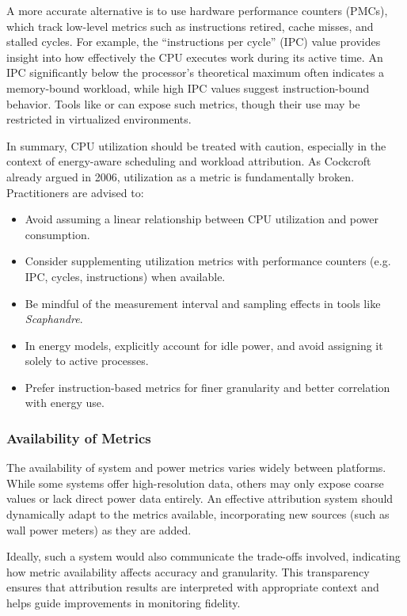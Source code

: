 A more accurate alternative is to use hardware performance counters (PMCs), which track low-level metrics such as instructions retired, cache misses, and stalled cycles. For example, the ``instructions per cycle'' (IPC) value provides insight into how effectively the CPU executes work during its active time. An IPC significantly below the processor's theoretical maximum often indicates a memory-bound workload, while high IPC values suggest instruction-bound behavior. Tools like  or  can expose such metrics, though their use may be restricted in virtualized environments.

In summary, CPU utilization should be treated with caution, especially in the context of energy-aware scheduling and workload attribution. As Cockcroft already argued in 2006, utilization as a metric is fundamentally broken\parencite{cockcroft2006utilization}. Practitioners are advised to:
\begin{itemize}
    \item Avoid assuming a linear relationship between CPU utilization and power consumption.
    \item Consider supplementing utilization metrics with performance counters (e.g. IPC, cycles, instructions) when available.
    \item Be mindful of the measurement interval and sampling effects in tools like \textit{Scaphandre}.
    \item In energy models, explicitly account for idle power, and avoid assigning it solely to active processes.
    \item Prefer instruction-based metrics for finer granularity and better correlation with energy use.
\end{itemize}

\subsubsection{Availability of Metrics}

The availability of system and power metrics varies widely between platforms. While some systems offer high-resolution data, others may only expose coarse values or lack direct power data entirely. An effective attribution system should dynamically adapt to the metrics available, incorporating new sources (such as wall power meters) as they are added.

Ideally, such a system would also communicate the trade-offs involved, indicating how metric availability affects accuracy and granularity. This transparency ensures that attribution results are interpreted with appropriate context and helps guide improvements in monitoring fidelity.

